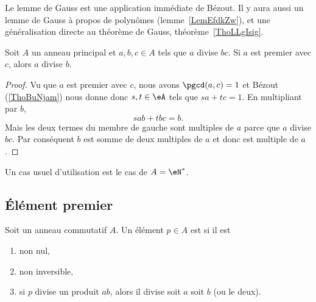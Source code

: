 Le lemme de Gauss est une application immédiate de Bézout. Il y aura aussi un lemme de Gauss à propos de polynômes (lemme~\ref{LemEfdkZw}), et une généralisation directe au théorème de Gauss, théorème~\ref{ThoLLgIsig}.
\begin{lemma}    \label{LemSdnZNX}
    Soit \( A\) un anneau principal et \( a,b,c\in A\) tels que \( a\) divise \( bc\). Si \( a\) est premier avec \( c\), alors \( a\) divise \( b\).
\end{lemma}

\begin{proof}
    Vu que \( a\) est premier avec \( c\), nous avons \( \pgcd(a,c)=1\) et Bézout (\ref{ThoBuNjam}) nous donne donc \( s,t\in \eA\) tels que \( sa+tc=1\). En multipliant par \( b\),
    \begin{equation}
        sab+tbc=b.
    \end{equation}
    Mais les deux termes du membre de gauche sont multiples de \( a\) parce que \( a\) divise \( bc\). Par conséquent \( b\) est somme de deux multiples de \( a\) et donc est multiple de \( a\).
\end{proof}
Un cas usuel d'utilisation est le cas de \( A=\eN^*\).

\subsection{Élément premier}

\begin{definition}       \label{DEFooZCRQooWXRalw}
    Soit un anneau commutatif \( A\). Un élément \( p\in A\) est  si il est
    \begin{enumerate}
        \item
            non nul,
        \item
            non inversible,
        \item       \label{ITEMooPMTTooCVHPIm}
            si \( p\) divise un produit \( ab\), alors il divise soit \( a\) soit \( b\) (ou le deux).
    \end{enumerate}
\end{definition}


